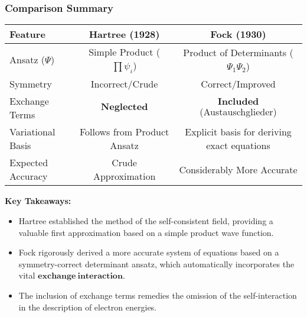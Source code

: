 \begin{frame}
    \frametitle{Comparison Summary}
    \begin{center}
        \begin{tabular}{|l|c|c|}
            \hline
            \textbf{Feature} & \textbf{Hartree (1928)} & \textbf{Fock (1930)} \\
            \hline
            Ansatz ($\Psi$) & Simple Product ($\prod \psi_i$)  & Product of Determinants ($\Psi_1 \Psi_2$) \\
            \hline
            Symmetry & Incorrect/Crude  & Correct/Improved \\
            \hline
            Exchange Terms & $\mathbf{Neglected}$  & $\mathbf{Included}$ (Austauschglieder)  \\
            \hline
            Variational Basis & Follows from Product Ansatz  & Explicit basis for deriving exact equations  \\
            \hline
            Expected Accuracy & Crude Approximation  & Considerably More Accurate  \\
            \hline
        \end{tabular}
    \end{center}
    \vfill
    \textbf{Key Takeaways:}
    \begin{itemize}
        \item Hartree established the method of the self-consistent field, providing a valuable first approximation based on a simple product wave function.
        \item Fock rigorously derived a more accurate system of equations based on a symmetry-correct determinant ansatz, which automatically incorporates the vital $\mathbf{exchange~interaction}$.
        \item The inclusion of exchange terms remedies the omission of the self-interaction in the description of electron energies.
    \end{itemize}
\end{frame}

